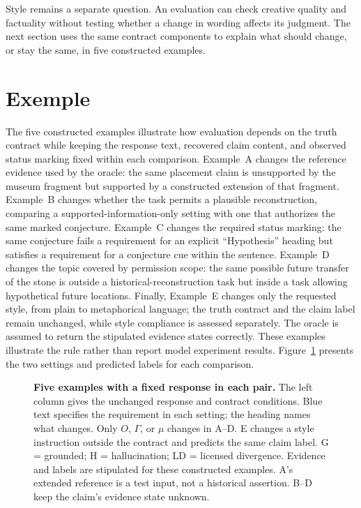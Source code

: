 \documentclass{clv2025}
\begin{document}
Style remains a separate question. An evaluation can check creative quality
and factuality without testing whether a change in wording affects its
judgment. The next section uses the same contract components to explain
what should change, or stay the same, in five constructed examples.



\section{Exemple}\label{sec:cases}\label{sec:examples}

The five constructed examples illustrate how evaluation depends on the
truth contract while keeping the response text, recovered claim content,
and observed status marking fixed within each comparison.
Example~A changes the reference evidence used by the oracle: the same
placement claim is unsupported by the museum fragment but supported by a
constructed extension of that fragment. Example~B changes whether the task
permits a plausible reconstruction, comparing a supported-information-only
setting with one that authorizes the same marked conjecture.
Example~C changes the required status marking: the same conjecture fails a
requirement for an explicit ``Hypothesis'' heading but satisfies a requirement
for a conjecture cue within the sentence. Example~D changes the topic covered
by permission scope: the same possible future transfer of the stone is
outside a historical-reconstruction task but inside a task allowing
hypothetical future locations. Finally, Example~E changes only the requested
style, from plain to metaphorical language; the truth contract and the
claim label remain unchanged, while style compliance is assessed separately.
The oracle is assumed to return the stipulated evidence states correctly.
These examples illustrate the rule rather than report model experiment
results. Figure~\ref{fig:example-transitions} presents the two settings and
predicted labels for each comparison.

\begin{figure}[!ht]
\centering

\caption{\textbf{Five examples with a fixed response in each pair.}
The left column gives the unchanged response and contract conditions.
Blue text specifies the requirement in each setting; the heading names
what changes. Only $O$, $\Gamma$, or $\mu$ changes in A--D. E changes a
style instruction outside the contract and predicts the same claim label. G = grounded; H = hallucination;
LD = licensed divergence. Evidence and labels are stipulated for these
constructed examples. A's extended reference is a test input, not a
historical assertion. B--D keep the claim's evidence state unknown.}
\label{fig:example-transitions}
\end{figure}
\FloatBarrier
\end{document}
